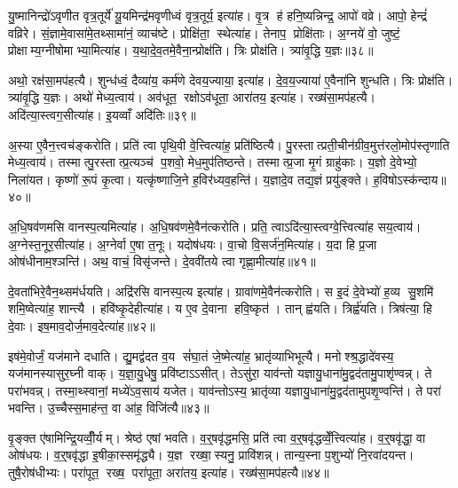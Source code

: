 यु॒ष्मानिन्द्रो॑ऽवृणीत वृत्र॒तूर्ये॑ यू॒यमिन्द्र॑मवृणीध्वं वृत्र॒तूर्य॒ इत्या॑ह। वृ॒त्र ह॑ हनि॒ष्यन्निन्द्र॒ आपो॑ वव्रे। आपो॒ हेन्द्रं॑ वव्रिरे। सं॒ज्ञामे॒वासा॑मे॒तथ्सामा॑नं॒ व्याच॑ष्टे। प्रोक्षि॑ता॒ स्थेत्या॑ह। तेनाप॒ प्रोक्षि॑ताः। अ॒ग्नये॑ वो॒ जुष्टं॒ प्रोक्षाम्य॒ग्नीषोमाभ्या॒मित्या॑ह। य॒था॒दे॒व॒तमे॒वैना॒न्प्रोक्ष॑ति। त्रिः प्रोक्ष॑ति। त्र्या॑वृ॒द्धि य॒ज्ञः॥३८॥

अथो॒ रक्ष॑सा॒मप॑हत्यै। शुन्ध॑ध्वं॒ दैव्या॑य॒ कर्म॑णे देवय॒ज्याया॒ इत्या॑ह। दे॒व॒य॒ज्याया॑ ए॒वैना॑नि शुन्धति। त्रिः प्रोक्ष॑ति। त्र्या॑वृ॒द्धि य॒ज्ञः। अथो॑ मेध्य॒त्वाय॑। अव॑धूत॒ रक्षोऽव॑धूता॒ आरा॑तय॒ इत्या॑ह। रख्ष॑सा॒मप॑हत्यै। अदि॑त्या॒स्त्वग॒सीत्या॑ह। इ॒यव्वाँ अदि॑तिः॥३९॥

अ॒स्या ए॒वैन॒त्त्वच॑ङ्करोति। प्रति॑ त्वा पृथि॒वी वे॒त्त्वित्या॑ह॒ प्रति॑ष्ठित्यै। पु॒रस्तात्प्रती॒चीन॑ग्रीव॒मुत्त॑रलो॒मोप॑स्तृणाति मेध्य॒त्वाय॑। तस्मात्पु॒रस्तात्प्र॒त्यञ्च॑ प॒शवो॒ मेध॒मुप॑तिष्ठन्ते। तस्मात्प्र॒जा मृ॒गं ग्राहु॑काः। य॒ज्ञो दे॒वेभ्यो॒ निला॑यत। कृष्णो॑ रू॒पं कृ॒त्वा। यत्कृ॑ष्णाजि॒ने ह॒विर॑ध्यव॒हन्ति॑। य॒ज्ञादे॒व तद्य॒ज्ञं प्रयु॑ङ्क्ते। ह॒विषोऽस्क॑न्दाय॥४०॥

अ॒धि॒षव॑णमसि वानस्प॒त्यमित्या॑ह। अ॒धि॒षव॑णमे॒वैन॑त्करोति। प्रति॒ त्वाऽदि॑त्या॒स्त्वग्वे॒त्त्वित्या॑ह सय॒त्वाय॑। अ॒ग्नेस्त॒नूर॒सीत्या॑ह। अ॒ग्नेर्वा ए॒षा त॒नूः। यदोष॑धयः। वा॒चो वि॒सर्ज॑न॒मित्या॑ह। य॒दा हि प्र॒जा ओष॑धीनाम॒श्ञन्ति॑। अथ॒ वाचं॒ विसृ॑जन्ते। दे॒ववी॑तये त्वा गृह्णा॒मीत्या॑ह॥४१॥

दे॒वता॑भिरे॒वैन॒थ्सम॑र्धयति। अद्रि॑रसि वानस्प॒त्य इत्या॑ह। ग्रावा॑णमे॒वैन॑त्करोति। स इ॒दं दे॒वेभ्यो॑ ह॒व्य सु॒शमि॑ शमि॒ष्वेत्या॑ह॒ शान्त्यै। हवि॑ष्कृ॒देहीत्या॑ह। य ए॒व दे॒वाना हवि॒ष्कृत॑। तान्‌ ह्व॑यति। त्रिर्ह्व॑यति। त्रिष॑त्या॒ हि दे॒वाः। इष॒माव॒दोर्ज॒माव॒देत्या॑ह॥४२॥

इष॑मे॒वोर्जं॒ यज॑माने दधाति। द्यु॒मद्व॑दत व॒य सं॑घा॒तं जे॒ष्मेत्या॑ह॒ भ्रातृ॑व्याभिभूत्यै। मनोश्श्र॒द्धादे॑वस्य॒ यज॑मानस्यासुर॒घ्नी वाक्। य॒ज्ञा॒यु॒धेषु॒ प्रवि॑ष्टाऽऽसीत्। तेऽसु॑रा॒ याव॑न्तो यज्ञायु॒धाना॑मु॒द्वद॑तामु॒पाशृ॑ण्वन्न्। ते परा॑भवन्न्। तस्मा॒थ्स्वानां॒ मध्ये॑ऽव॒साय॑ यजेत। याव॑न्तोऽस्य॒ भ्रातृ॑व्या यज्ञायु॒धाना॑मु॒द्वद॑तामुपशृ॒ण्वन्ति॑। ते परा॑ भवन्ति। उ॒च्चैस्स॒माह॑न्त॒ वा आ॑ह॒ विजि॑त्यै॥४३॥

वृ॒ङ्क्त ए॑षामिन्द्रि॒यव्वीँ॒र्यम्। श्रेष्ठ॑ एषां भवति। व॒र्\mbox{}॒षवृ॑द्धमसि॒ प्रति॑ त्वा व॒र्\mbox{}॒षवृ॑द्धव्वेँ॒त्त्वित्या॑ह। व॒र्\mbox{}॒षवृ॑द्धा॒ वा ओष॑धयः। व॒र्\mbox{}॒षवृ॑द्धा इ॒षीका॒स्समृ॑द्ध्यै। य॒ज्ञ रख्षा॒स्यनु॒ प्रावि॑शन्न्। तान्य॒स्ना प॒शुभ्यो॑ नि॒रवा॑दयन्त। तुषै॒रोष॑धीभ्यः। परा॑पूत॒ रख्ष॒ परा॑पूता॒ अरा॑तय॒ इत्या॑ह। रख्ष॑सा॒मप॑हत्यै॥४४॥

